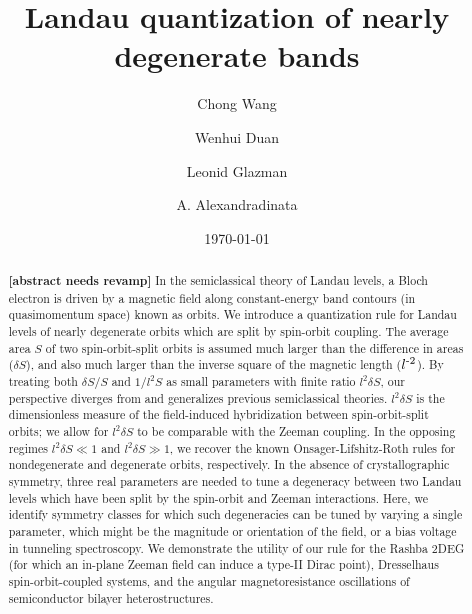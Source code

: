 \documentclass[aps, prb, showpacs, twocolumn, notitlepage, superscriptaddress]{revtex4-1}
\begin{document}
\title{Landau quantization of nearly degenerate bands}

\author{Chong Wang}
\author{Wenhui Duan}
\author{Leonid Glazman}
\author{A. Alexandradinata}

\begin{abstract}
\textbf{[abstract needs revamp]}
 In the semiclassical theory of Landau levels, a Bloch electron is driven by a magnetic field  along constant-energy band contours (in quasimomentum space) known as orbits. We introduce a quantization rule for Landau levels of nearly degenerate orbits which are split by spin-orbit coupling. The average area $S$ of two spin-orbit-split orbits is assumed much larger than the difference in areas ($\delta S$), and also much larger than the inverse square of the magnetic length ($l^{\text{-}2}$). By treating both $\delta S/S$ and $1/l^2S$ as small parameters with finite ratio $l^2\delta S$, our perspective diverges from and generalizes previous semiclassical theories.  $l^2\delta S$ is the dimensionless measure of the field-induced hybridization between spin-orbit-split orbits; we allow for $l^2\delta S$ to be comparable with the Zeeman coupling. In the opposing regimes $l^2\delta S {{\ll}} 1$  and $l^2\delta S{\gg}1$, we recover the known Onsager-Lifshitz-Roth rules for nondegenerate and degenerate orbits, respectively.  In the absence of crystallographic symmetry, three real parameters are needed to tune a degeneracy between two Landau levels which have been split by the spin-orbit and Zeeman interactions. Here, we identify symmetry classes for which such degeneracies can be tuned by varying a single parameter, which might be the magnitude or orientation of the field, or a bias voltage in tunneling spectroscopy.  We demonstrate the utility of our rule for the Rashba 2DEG (for which an in-plane Zeeman field can induce a type-II Dirac point), Dresselhaus spin-orbit-coupled systems, and the angular magnetoresistance oscillations of semiconductor bilayer heterostructures.      
\end{abstract}
\date{\today}
\end{document}
